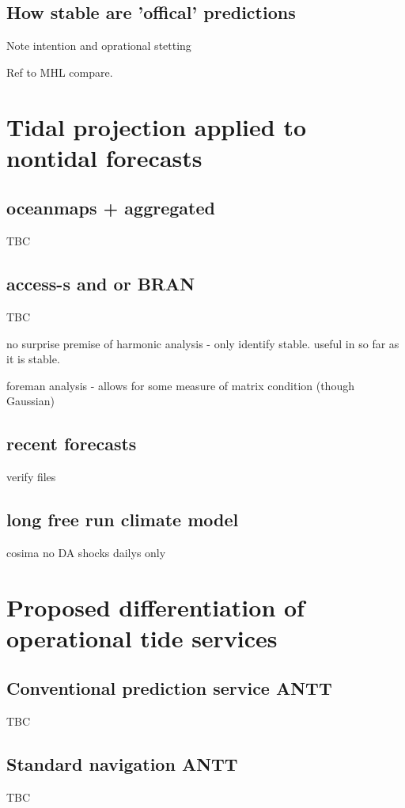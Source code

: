 \subsection{How stable are 'offical' predictions}

Note intention and oprational stetting

Ref to MHL compare.


\section{Tidal projection applied to nontidal forecasts}
\subsection{oceanmaps + aggregated}
TBC

\subsection{access-s and or BRAN}
TBC



no surprise
premise of harmonic analysis - only identify stable.
useful in so far as it is stable.

foreman analysis - allows for some measure of matrix condition (though Gaussian)


\subsection{ recent forecasts }
verify files


\subsection{ long free run climate model }
cosima
no DA shocks
dailys only




\section{Proposed differentiation of operational tide services}
\subsection{Conventional prediction service ANTT}

TBC

\subsection{Standard navigation ANTT}

TBC
